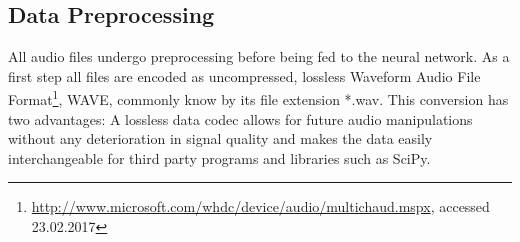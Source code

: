 \subsection{Data Preprocessing}
\label{sec:data_processing}

	All audio files undergo preprocessing before being fed to the neural network. As a first step all files are encoded as uncompressed, lossless Waveform Audio File Format\footnote{\url{http://www.microsoft.com/whdc/device/audio/multichaud.mspx}, accessed 23.02.2017}, WAVE, commonly know by its file extension *.wav. This conversion has two advantages: A lossless data codec allows for future audio manipulations without any deterioration in signal quality and makes the data easily interchangeable for third party programs and libraries such as SciPy\cite{scipy}. 

